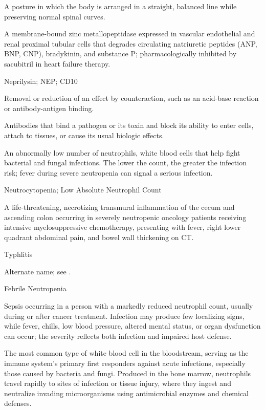  A posture in which the body is arranged in a straight, balanced line while preserving normal spinal curves.

 A membrane-bound zinc metallopeptidase expressed in vascular endothelial and renal proximal tubular cells that degrades circulating natriuretic peptides (ANP, BNP, CNP), bradykinin, and substance P; pharmacologically inhibited by sacubitril in heart failure therapy.

\synonyms
Neprilysin; NEP; CD10

 Removal or reduction of an effect by counteraction, such as an acid-base reaction or antibody-antigen binding.

 Antibodies that bind a pathogen or its toxin and block its ability to enter cells, attach to tissues, or cause its usual biologic effects.

 An abnormally low number of neutrophils, white blood cells that help fight bacterial and fungal infections. The lower the count, the greater the infection risk; fever during severe neutropenia can signal a serious infection.

\synonyms
Neutrocytopenia; Low Absolute Neutrophil Count

 A life-threatening, necrotizing transmural inflammation of the cecum and ascending colon occurring in severely neutropenic oncology patients receiving intensive myelosuppressive chemotherapy, presenting with fever, right lower quadrant abdominal pain, and bowel wall thickening on CT.

\synonyms
Typhlitis

 Alternate name; see .

\synonyms
Febrile Neutropenia

 Sepsis occurring in a person with a markedly reduced neutrophil count, usually during or after cancer treatment. Infection may produce few localizing signs, while fever, chills, low blood pressure, altered mental status, or organ dysfunction can occur; the severity reflects both infection and impaired host defense.

 The most common type of white blood cell in the bloodstream, serving as the immune system's primary first responders against acute infections, especially those caused by bacteria and fungi. Produced in the bone marrow, neutrophils travel rapidly to sites of infection or tissue injury, where they ingest and neutralize invading microorganisms using antimicrobial enzymes and chemical defenses.

